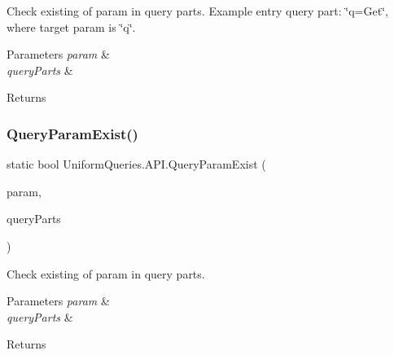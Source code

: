 Check existing of param in query parts. Example entry query part\+: \char`\"{}q=\+Get\char`\"{}, where target param is \char`\"{}q\char`\"{}. 


\begin{DoxyParams}{Parameters}
{\em param} & \\
\hline
{\em query\+Parts} & \\
\hline
\end{DoxyParams}
\begin{DoxyReturn}{Returns}

\end{DoxyReturn}
\mbox{\label{class_uniform_queries_1_1_a_p_i_ac0f8c9faebdc4a69f2072c0bb9e955e1}} 
\subsubsection{\texorpdfstring{Query\+Param\+Exist()}{QueryParamExist()}\hspace{0.1cm}{\footnotesize\ttfamily [3/3]}}
{\footnotesize\ttfamily static bool Uniform\+Queries.\+A\+P\+I.\+Query\+Param\+Exist (\begin{DoxyParamCaption}\item[{string}]{param,  }\item[{params \mbox{\hyperlink{struct_uniform_queries_1_1_query_part}{Query\+Part}} \mbox{[}$\,$\mbox{]}}]{query\+Parts }\end{DoxyParamCaption})\hspace{0.3cm}{\ttfamily [static]}}



Check existing of param in query parts. 


\begin{DoxyParams}{Parameters}
{\em param} & \\
\hline
{\em query\+Parts} & \\
\hline
\end{DoxyParams}
\begin{DoxyReturn}{Returns}

\end{DoxyReturn}
\mbox{\label{class_uniform_queries_1_1_a_p_i_a987eb23a48b90e542001cc12fcbc1ddc}} 
